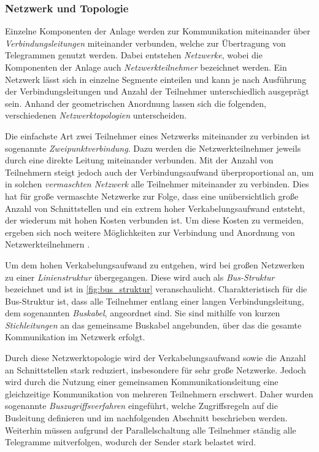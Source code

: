 \subsubsection{Netzwerk und Topologie}

Einzelne Komponenten der Anlage werden zur Kommunikation miteinander über \textit{Verbindungsleitungen} miteinander verbunden, welche zur Übertragung von Telegrammen genutzt werden. Dabei entstehen \textit{Netzwerke}, wobei die Komponenten der Anlage auch \textit{Netzwerkteilnehmer} bezeichnet werden. Ein Netzwerk lässt sich in einzelne Segmente einteilen und kann je nach Ausführung der Verbindungsleitungen und Anzahl der Teilnehmer unterschiedlich ausgeprägt sein. Anhand der geometrischen Anordnung lassen sich die folgenden, verschiedenen \textit{Netzwerktopologien} unterscheiden.


Die einfachste Art zwei Teilnehmer eines Netzwerks miteinander zu verbinden ist sogenannte \textit{Zweipunktverbindung}. Dazu werden die Netzwerkteilnehmer jeweils durch eine direkte Leitung miteinander verbunden. Mit der Anzahl von Teilnehmern steigt jedoch auch der Verbindungsaufwand überproportional an, um in solchen \textit{vermaschten Netzwerk} alle Teilnehmer miteinander zu verbinden. Dies hat für große vermaschte Netzwerke zur Folge, dass eine unübersichtlich große Anzahl von Schnittstellen und ein extrem hoher Verkabelungsaufwand entsteht, der wiederum mit hohen Kosten verbunden ist. Um diese Kosten zu vermeiden, ergeben sich noch weitere Möglichkeiten zur Verbindung und Anordnung von Netzwerkteilnehmern \cite[S.~1f.]{schn06}.


Um dem hohen Verkabelungsaufwand zu entgehen, wird bei großen Netzwerken zu einer \textit{Linienstruktur} übergegangen. Diese wird auch als \textit{Bus-Struktur} bezeichnet und ist in \ref{fig:bus_struktur} veranschaulicht. Charakteristisch für die Bus-Struktur ist, dass alle Teilnehmer entlang einer langen Verbindungsleitung, dem sogenannten \textit{Buskabel}, angeordnet sind. Sie sind mithilfe von kurzen \textit{Stichleitungen} an das gemeinsame Buskabel angebunden, über das die gesamte Kommunikation im Netzwerk erfolgt.

Durch diese Netzwerktopologie wird der Verkabelungsaufwand sowie die Anzahl an Schnittstellen stark reduziert, insbesondere für sehr große Netzwerke. Jedoch wird durch die Nutzung einer gemeinsamen Kommunikationsleitung eine gleichzeitige Kommunikation von mehreren Teilnehmern erschwert. Daher wurden sogenannte \textit{Buszugriffsverfahren} eingeführt, welche Zugriffsregeln auf die Busleitung definieren und im nachfolgenden Abschnitt beschrieben werden. Weiterhin müssen aufgrund der Parallelschaltung alle Teilnehmer ständig alle Telegramme mitverfolgen, wodurch der Sender stark belastet wird. 

